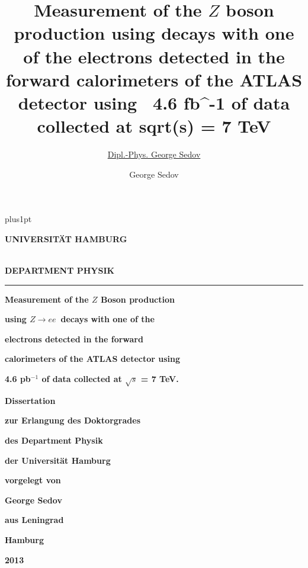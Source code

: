 \documentclass[oneside,11pt]{Classes/PhDthesisPSnPDF}
\title{Measurement of the $Z$ boson production using \Zee decays with one of the electrons
detected in the forward calorimeters of the ATLAS detector using  4.6 {fb}^{-1} of data
collected at sqrt(s) = 7 TeV}
\author{\href{radist.morse@gmail.com}{Dipl.-Phys. George Sedov}}
\author{George Sedov}
\def\Zee{\ensuremath{Z \rightarrow ee}}
\begin{document}
\hypersetup{linktocpage}
%

\renewcommand\baselinestretch{1.2}
\baselineskip=16pt plus1pt


\begin{titlepage}
\vspace*{-1.6cm}
{\raggedright \large \bf \MakeUppercase{Universit\"{a}t Hamburg}} \\
{\large \bf \MakeUppercase{Department Physik} }\\
  \rule{\textwidth}{0.5pt}
    \vspace*{1.0cm}
	\begin{center}

	     {\huge\bf{Measurement of the $Z$ Boson production}\par}
           \vspace*{0.2cm}
	     {\huge\bf{using \Zee\ decays with one of the}\par}
           \vspace*{0.2cm}
	     {\huge\bf{electrons detected in the forward}\par}
           \vspace*{0.2cm}
	     {\huge\bf{calorimeters of the ATLAS detector using }\par}
           \vspace*{0.2cm}
	     {\huge\bf{4.6 pb$^{-1}$ of data collected at $\sqrt{s}$ = 7 TeV.}\par}

	        \vspace*{2.6cm}
        {\LARGE\bf Dissertation\par}
	        \vspace*{0.1cm}
	     {\LARGE\bf zur Erlangung des Doktorgrades\par }
	        \vspace*{0.1cm}
        {\LARGE\bf des Department Physik\par }
           \vspace*{0.1cm}
	     {\LARGE\bf der Universit\"{a}t Hamburg \par }
	        \vspace*{2.2cm}
        {\Large\bf vorgelegt von\par}
	        \vspace*{0.1cm}
        {\Large\bf George Sedov\par }
           \vspace{0.1cm}
	     {\Large\bf aus Leningrad \par }
	        \vspace*{2.2cm}
        {\Large\bf{Hamburg}\par}
	        \vspace*{0.1cm}
        {\Large\bf{2013}}
\end{center}
\end{titlepage}
\end{document}
